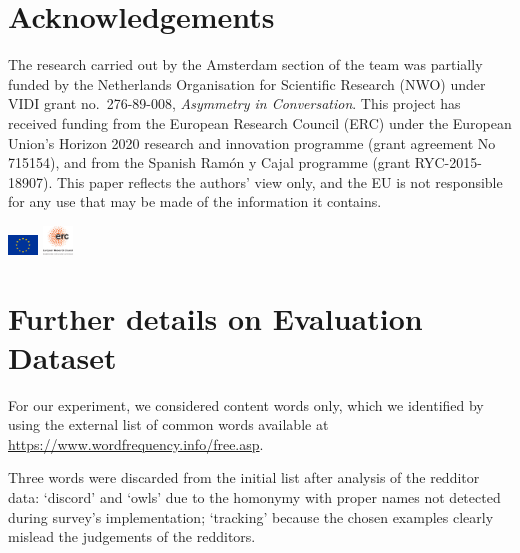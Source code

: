 \documentclass[11pt,a4paper]{article}
\begin{document}
\section*{Acknowledgements}
The research carried out by the Amsterdam section of the team was partially funded by the Netherlands Organisation for Scientific Research (NWO) under VIDI grant no.~276-89-008, {\em Asymmetry in Conversation}.
This project has received funding from the European Research Council (ERC) under the European Union’s Horizon 2020 research and innovation programme (grant agreement No 715154), and from the Spanish Ram\'on y Cajal programme (grant RYC-2015-18907). This paper reflects the authors' view only, and the EU is not responsible for any use that may be made of the information it contains.
\begin{flushright}
\includegraphics[width=0.8cm]{flag_yellow_low.jpeg}  
\includegraphics[width=0.8cm]{LOGO-ERC.jpg} 
\end{flushright}




\appendix

%
%


\section{Further details on Evaluation Dataset}
\label{sec:further_details_data_model}

For our experiment, we considered content words only, which we identified by using the external list of common words available at \url{https://www.wordfrequency.info/free.asp}.

Three words were discarded from the initial list after analysis of the redditor data: `discord' and `owls' due to the homonymy with proper names not detected during survey's implementation; `tracking' because the chosen examples clearly mislead the judgements of the redditors.
\end{document}
